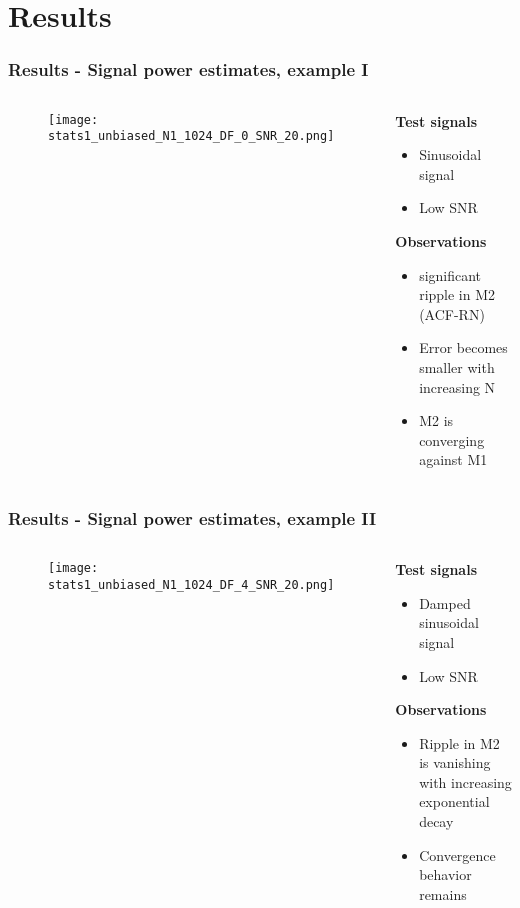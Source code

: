 \documentclass[11pt,aspectratio=169]{beamer}
\begin{document}
	\section{Results}
	\begin{frame}
		\frametitle{Results - Signal power estimates, example I}
		\begin{columns}[t]
			\begin{RIPcolleft}
				\begin{figure}
					\texttt{[image: stats1\_unbiased\_N1\_1024\_DF\_0\_SNR\_20.png]}
				\end{figure}
			\end{RIPcolleft}
			\begin{RIPcolright}
				\textbf{Test signals}\\
				\begin{itemize}
					\item Sinusoidal signal
					\item Low SNR
				\end{itemize}
				\textbf{Observations}\\
				\begin{itemize}
					\item significant ripple in M2 (ACF-RN)
					\item Error becomes smaller with increasing N
					\item M2 is converging against M1
				\end{itemize}
			\end{RIPcolright}
		\end{columns}
	\end{frame}
	\begin{frame}
		\frametitle{Results - Signal power estimates, example II}
		\begin{columns}[t]
			\begin{RIPcolleft}
				\begin{figure}
					\texttt{[image: stats1\_unbiased\_N1\_1024\_DF\_4\_SNR\_20.png]}
				\end{figure}
			\end{RIPcolleft}
			\begin{RIPcolright}
				\textbf{Test signals}\\
				\begin{itemize}
					\item Damped sinusoidal signal
					\item Low SNR
				\end{itemize}
				\textbf{Observations}\\
				\begin{itemize}
					\item Ripple in M2 is vanishing with increasing exponential decay
					\item Convergence behavior remains
				\end{itemize}
			\end{RIPcolright}
		\end{columns}
	\end{frame}
\end{document}
